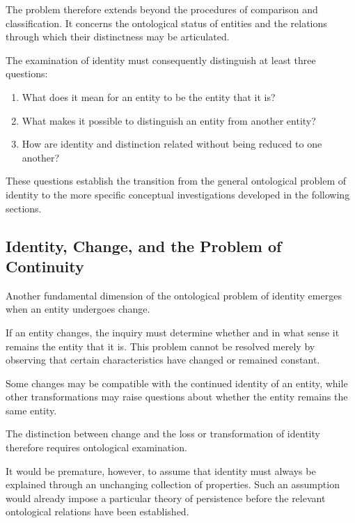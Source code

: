 The problem therefore extends beyond the procedures
of comparison and classification. It concerns the
ontological status of entities and the relations
through which their distinctness may be articulated.

The examination of identity must consequently
distinguish at least three questions:

\begin{enumerate}
    \item What does it mean for an entity to be the
    entity that it is?
    \item What makes it possible to distinguish an
    entity from another entity?
    \item How are identity and distinction related
    without being reduced to one another?
\end{enumerate}

These questions establish the transition from the
general ontological problem of identity to the more
specific conceptual investigations developed in
the following sections.



\subsection{Identity, Change, and the Problem of Continuity}
\label{subsec:identity-change-continuity-problem}

Another fundamental dimension of the ontological
problem of identity emerges when an entity undergoes
change.

If an entity changes, the inquiry must determine
whether and in what sense it remains the entity that
it is. This problem cannot be resolved merely by
observing that certain characteristics have changed
or remained constant.

Some changes may be compatible with the continued
identity of an entity, while other transformations
may raise questions about whether the entity remains
the same entity.

The distinction between change and the loss or
transformation of identity therefore requires
ontological examination.

It would be premature, however, to assume that
identity must always be explained through an
unchanging collection of properties. Such an
assumption would already impose a particular theory
of persistence before the relevant ontological
relations have been established.

